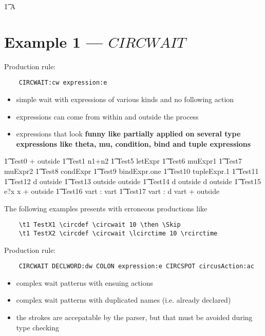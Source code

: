 \documentclass{article}
\begin{document}
\begin{circusaction}
	\t1 A \circdef \Skip
\end{circusaction}

\newpage
\section{Example 1 --- $CIRCWAIT$}

Production rule: 
\begin{verbatim}
	CIRCWAIT:cw expression:e
\end{verbatim}
%
\begin{itemize}
   \item simple wait with expressions of various kinds and no following action
   \item expressions can come from within and outside the process
   \item expressions that look {\bf funny like partially applied on several type expressions like theta, mu, condition, bind and tuple expressions}
\end{itemize}
%
\begin{circusaction}
   \t1 Test0 \circdef {} + outside
   \also
   \t1 Test1 \circdef \circwait n1+n2 
   \also
   \t1 Test5 \circdef \circwait letExpr
   \also
   \t1 Test6 \circdef \circwait muExpr1
   \also
   \t1 Test7 \circdef \circwait muExpr2
   \also
   \t1 Test8 \circdef \circwait condExpr
   \also
   \t1 Test9 \circdef \circwait bindExpr.one
   \also
   \t1 Test10 \circdef \circwait tupleExpr.1
   \also
   \t1 Test11 \circdef {} 
   \also
   \t1 Test12 \circdef d \then \circwait outside
   \also
   \t1 Test13 \circdef \circwait outside \circseq \circwait outside
   \also
   \t1 Test14 \circdef d \then \circwait outside \circseq d \then \circwait outside
   \also
   \t1 Test15 \circdef e?x \then \circwait x + outside
   \also
   \t1 Test16 \circdef \circvres vart : \nat  \circspot \circwait vart 
   \also
   \t1 Test17 \circdef \circvres vart : \nat  \circspot d \then \circwait vart + outside
\end{circusaction}
%
The following examples presents with erroneous productions like
\begin{verbatim}
	\t1 TestX1 \circdef \circwait 10 \then \Skip
	\t1 TestX2 \circdef \circwait \lcirctime 10 \rcirctime 
\end{verbatim}

Production rule:
\begin{verbatim}
	CIRCWAIT DECLWORD:dw COLON expression:e CIRCSPOT circusAction:ac
\end{verbatim}
%
\begin{itemize}
	\item complex wait patterns with ensuing actions
	\item complex wait patterns with duplicated names (i.e. already declared)
        \item the strokes are accepatable by the parser, but that must be avoided during type checking
\end{itemize}
\end{document}
